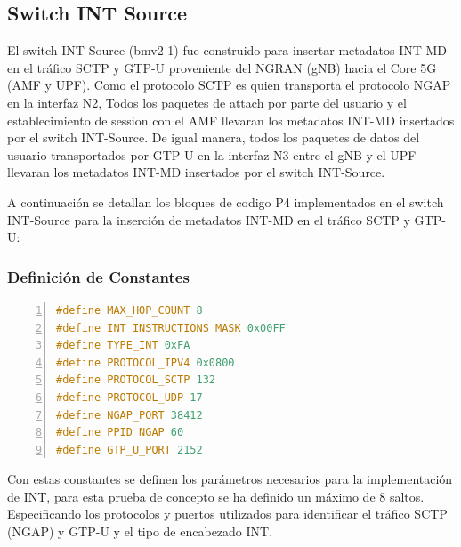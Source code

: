 \subsection{Switch INT Source}
El switch INT-Source (bmv2-1) fue construido para insertar metadatos INT-MD en el tráfico SCTP y GTP-U proveniente del NGRAN (gNB) hacia el Core 5G (AMF y UPF). Como el protocolo SCTP es quien transporta el protocolo NGAP en la interfaz N2, Todos los paquetes de attach por parte del usuario y el establecimiento de session con el AMF llevaran los metadatos INT-MD insertados por el switch INT-Source. De igual manera, todos los paquetes de datos del usuario transportados por GTP-U en la interfaz N3 entre el gNB y el UPF llevaran los metadatos INT-MD insertados por el switch INT-Source.

A continuación se detallan los bloques de codigo P4 implementados en el switch INT-Source para la inserción de metadatos INT-MD en el tráfico SCTP y GTP-U:
\subsubsection{Definición de Constantes}
 \begin{lstlisting}[language=C++,
    basicstyle=\ttfamily\footnotesize,
    keywordstyle=\color{blue!70!black}\bfseries,
    commentstyle=\color{green!50!black}\itshape,
    stringstyle=\color{red!80!black},
    directivestyle=\color{blue!70!black}\bfseries,
    numbers=left,
    numberstyle=\tiny\color{gray!70},
    stepnumber=1,
    numbersep=10pt,
    backgroundcolor=\color{gray!5},
    showstringspaces=false,
    breaklines=true,
    frame=single,
    frameround=tttt,
    rulecolor=\color{gray!30},
    captionpos=b,
    tabsize=4,
    xleftmargin=15pt,
    framexleftmargin=12pt,
    caption={Constantes INT}, 
    label=lst:int-constantes]
#define MAX_HOP_COUNT 8
#define INT_INSTRUCTIONS_MASK 0x00FF
#define TYPE_INT 0xFA
#define PROTOCOL_IPV4 0x0800
#define PROTOCOL_SCTP 132
#define PROTOCOL_UDP 17
#define NGAP_PORT 38412
#define PPID_NGAP 60
#define GTP_U_PORT 2152
\end{lstlisting}

Con estas constantes se definen los parámetros necesarios para la implementación de INT, para esta prueba de concepto se ha definido un máximo de 8 saltos. Especificando los protocolos y puertos utilizados para identificar el tráfico SCTP (NGAP) y GTP-U y el tipo de encabezado INT.

